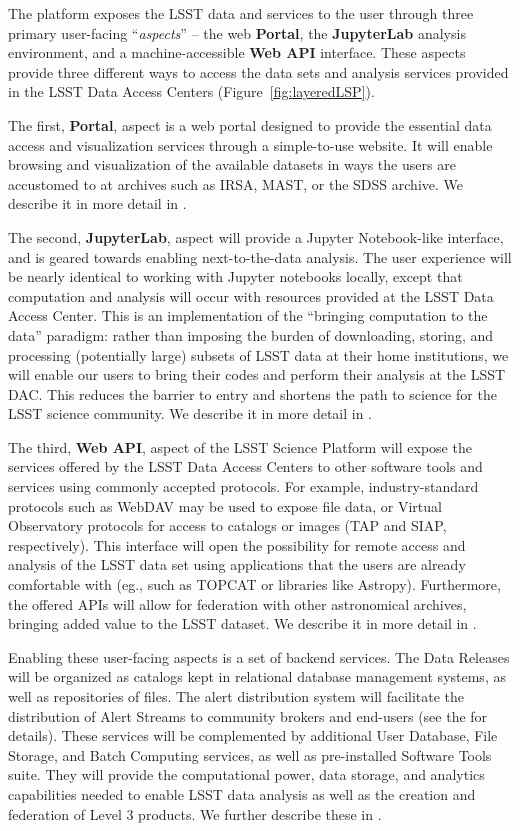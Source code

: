 \documentclass[DM,lsstdraft,toc]{lsstdoc}
\begin{document}
The platform exposes the LSST data
and services to the user through three primary user-facing ``{\it aspects}'' -- the web {\bf Portal},
the {\bf JupyterLab} analysis environment, and a machine-accessible {\bf Web API} interface. These aspects provide three different ways to access the data sets and analysis services provided in the LSST Data Access Centers (Figure~\ref{fig:layeredLSP}).

The first, {\bf Portal}, aspect is a web portal designed to provide the essential data
access and visualization services through a simple-to-use website.  It will
enable browsing and visualization of the available datasets in ways the
users are accustomed to at archives such as IRSA, MAST, or the SDSS archive.
We describe it in more detail in .

The second, {\bf JupyterLab}, aspect will provide a Jupyter Notebook-like interface, and 
is geared towards enabling next-to-the-data analysis. The user experience will 
be nearly identical to working with Jupyter notebooks locally, except that computation
and analysis will occur with resources provided at the LSST Data Access Center.  This is an
implementation of the “bringing computation to the data” paradigm: rather
than imposing the burden of downloading, storing, and processing (potentially large)
subsets of LSST data at their home institutions, we will enable our users to
bring their codes and perform their analysis at the LSST DAC.
This reduces the barrier to entry and shortens the path to science for
the LSST science community. We describe it in more detail in .

The third, {\bf Web API}, aspect of the LSST Science Platform will expose the
services offered by the LSST Data Access Centers to other software tools and
services using commonly accepted protocols. For example, industry-standard
protocols such as WebDAV may be used to expose file data, or Virtual Observatory
protocols for access to catalogs or images (TAP and SIAP, respectively). This interface will open the
possibility for remote access and analysis of the LSST  data set using
applications that the users are already comfortable with (eg., such as TOPCAT 
or libraries like Astropy). Furthermore, the offered APIs will allow for federation
with other astronomical archives, bringing added value to the LSST dataset.
We describe it in more detail in .

Enabling these user-facing aspects is a set of backend services. The Data Releases will be organized as catalogs kept in relational database management systems, as well as repositories of files. The alert distribution system will facilitate the distribution of Alert Streams to community brokers and end-users (see the \DPDD for details). These services will be complemented by additional User Database, File Storage, and Batch Computing services, as well as pre-installed Software Tools suite. They will provide the computational power, data storage, and analytics capabilities needed to enable LSST data analysis as well as the creation and federation of Level 3 products. We further describe these in .
\end{document}
